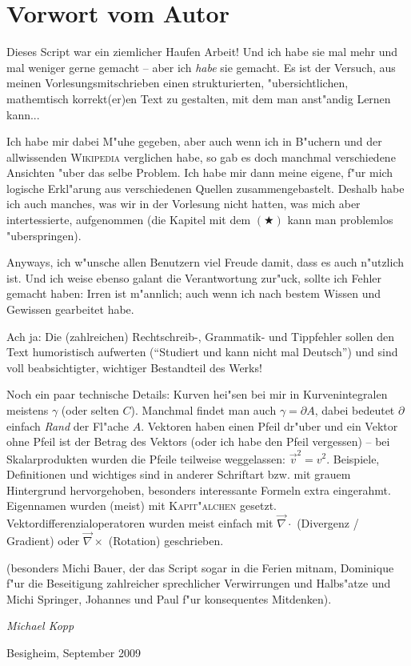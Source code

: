 \chapter{Vorwort vom Autor}
\label{kap_vorwort}

Dieses Script war ein ziemlicher Haufen Arbeit! Und ich habe sie mal
mehr und mal weniger gerne gemacht -- aber ich \emph{habe} sie
gemacht.  Es ist der Versuch, aus meinen Vorlesungsmitschrieben einen
strukturierten, "ubersichtlichen, mathemtisch korrekt(er)en Text zu
gestalten, mit dem man anst"andig Lernen kann...

Ich habe mir dabei M"uhe gegeben, aber auch wenn ich in B"uchern und
der allwissenden \textsc{Wikipedia} verglichen habe, so gab es doch
manchmal verschiedene Ansichten "uber das selbe Problem. Ich habe mir
dann meine eigene, f"ur mich logische Erkl"arung aus verschiedenen
Quellen zusammengebastelt. Deshalb habe ich auch manches, was wir in
der Vorlesung nicht hatten, was mich aber intertessierte, aufgenommen
(die Kapitel mit dem $(\bigstar)$ kann man problemlos "uberspringen).


Anyways, ich w"unsche allen Benutzern viel Freude damit, dass es auch
n"utzlich ist. Und ich weise ebenso galant die Verantwortung zur"uck,
sollte ich Fehler gemacht haben: Irren ist m"annlich; auch wenn ich
nach bestem Wissen und Gewissen gearbeitet habe.

Ach ja: Die (zahlreichen) Rechtschreib-, Grammatik- und Tippfehler
sollen den Text humoristisch aufwerten ("`Studiert und kann nicht mal
Deutsch"') und sind voll beabsichtigter,  wichtiger Bestandteil des
Werks!

\abs
Noch ein paar technische Details: Kurven hei"sen bei mir in
Kurvenintegralen meistens $\gamma$ (oder selten $C$). Manchmal findet
man auch $\gamma = \partial A$, dabei bedeutet $\partial$ einfach
\emph{Rand} der Fl"ache $A$. Vektoren haben einen Pfeil dr"uber und
ein Vektor ohne Pfeil ist der Betrag des Vektors (oder ich habe den
Pfeil vergessen) -- bei Skalarprodukten wurden die Pfeile teilweise
weggelassen: ${\vec v}^2 = v^2$. Beispiele, Definitionen und wichtiges
sind in anderer Schriftart bzw. mit grauem Hintergrund hervorgehoben,
besonders interessante Formeln extra eingerahmt. Eigennamen wurden
(meist) mit \textsc{Kapit"alchen}
gesetzt. Vektordifferenzialoperatoren wurden meist einfach mit $\vec \nabla
\cdot$ (Divergenz / Gradient) oder $\vec \nabla \times$ (Rotation)
geschrieben.

 (besonders
Michi Bauer, der das Script sogar in die Ferien mitnam, Dominique f"ur
die Beseitigung zahlreicher sprechlicher Verwirrungen und Halbs"atze
und Michi Springer, Johannes und Paul f"ur konsequentes Mitdenken).

\vfill
\hfill \textit{Michael Kopp}

\hfill Besigheim, September 2009


